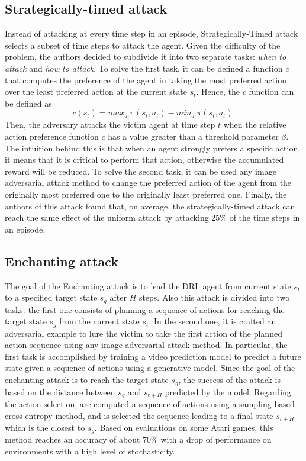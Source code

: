 \subsection{Strategically-timed attack}
Instead of attacking at every time step in an episode, Strategically-Timed attack \cite{lin2017tactics} selects a subset of time steps to attack the agent. Given the difficulty of the problem, the authors decided to subdivide it into two separate tasks: \textit{when to attack} and \textit{how to attack}. To solve the first task, it can be defined a function \(c\) that computes the preference of the agent in taking the most preferred action over the least preferred action at the current state \(s_t\). Hence, the \(c\) function can be defined as 
\begin{equation}
c(s_t)=max_{a_t}\pi(s_t,a_t)-min_{a_t}\pi(s_t,a_t).
\end{equation}
Then, the adversary attacks the victim agent at time step \(t\) when the relative action preference function \(c\) has a value greater than a threshold parameter \(\beta\). The intuition behind this is that when an agent strongly prefers a specific action, it means that it is critical to perform that action, otherwise the accumulated reward will be reduced. To solve the second task, it can be used any image adversarial attack method to change the preferred action of the agent from the originally most preferred one to the originally least preferred one. Finally, the authors of this attack found that, on average, the strategically-timed attack can reach the same effect of the uniform attack \cite{s2017adversarial} by attacking 25\% of the time steps in an episode. 

\subsection{Enchanting attack}
The goal of the Enchanting attack \cite{lin2017tactics} is to lead the DRL agent from current state \(s_t\) to a specified target state \(s_g\) after \(H\) steps. Also this attack is divided into two tasks: the first one consists of planning a sequence of actions for reaching the target state \(s_g\) from the current state \(s_t\). In the second one, it is crafted an adversarial example to lure the victim to take the first action of the planned action sequence using any image adversarial attack method. In particular, the first task is accomplished by training a video prediction model to predict a future state given a sequence of actions using a generative model. Since the goal of the enchanting attack is to reach the target state \(s_g\), the success of the attack is based on the distance between \(s_g\) and \(s_{t+H}\) predicted by the model. Regarding the action selection, are computed a sequence of actions using a sampling-based cross-entropy method, and is selected the sequence leading to a final state \(s_{t+H}\) which is the closest to \(s_g\). Based on evaluations on some Atari games, this method reaches an accuracy of about 70\% with a drop of performance on environments with a high level of stochasticity.

